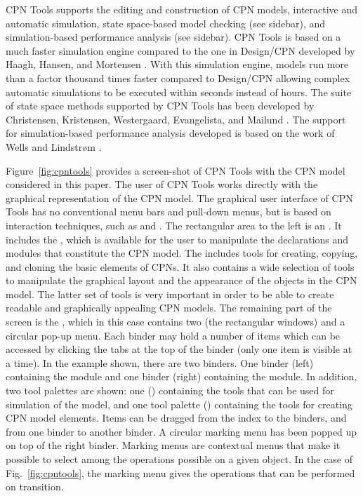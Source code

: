 CPN Tools supports the editing and construction of CPN models,
interactive and automatic simulation, state space-based model checking
(see sidebar), and simulation-based performance analysis (see
sidebar). CPN Tools is based on a much faster simulation engine
compared to the one in Design/CPN developed by Haagh, Hansen, and
Mortensen \cite{newsim}. With this simulation engine, models run more
than a factor thousand times faster compared to Design/CPN allowing
complex automatic simulations to be executed within seconds instead of
hours. The suite of state space methods supported by CPN Tools has
been developed by Christensen, Kristensen, Westergaard, Evangelista,
and Mailund \cite{asap,sweep}. The support for simulation-based
performance analysis developed is based on the work of Wells and
Lindstr\o{}m \cite{performance1}.

Figure~\ref{fig:cpntools} provides a screen-shot of CPN Tools with the
CPN model considered in this paper. The user of CPN Tools works
directly with the graphical representation of the CPN model. The
graphical user interface of CPN Tools has no conventional menu bars
and pull-down menus, but is based on interaction techniques, such as
 and . The rectangular
area to the left is an . It includes the , which is available for the user to manipulate the declarations
and modules that constitute the CPN model. The 
includes tools for creating, copying, and cloning the basic elements
of CPNs. It also contains a wide selection of tools to manipulate the
graphical layout and the appearance of the objects in the CPN
model. The latter set of tools is very important in order to be able
to create readable and graphically appealing CPN models. The remaining
part of the screen is the , which in this case
contains two  (the rectangular windows) and a
circular pop-up menu. Each binder may hold a number of items which can
be accessed by clicking the tabs at the top of the binder (only one
item is visible at a time). In the example shown, there are two
binders. One binder (left) containing the  module and
one binder (right) containing the  module. In
addition, two tool palettes are shown: one () containing
the tools that can be used for simulation of the model, and one tool
palette () containing the tools for creating CPN model
elements. Items can be dragged from the index to the binders, and from
one binder to another binder. A circular marking menu has been popped
up on top of the right binder. Marking menus are contextual menus that
make it possible to select among the operations possible on a given
object. In the case of Fig.~\ref{fig:cpntools}, the marking menu gives
the operations that can be performed on transition.


